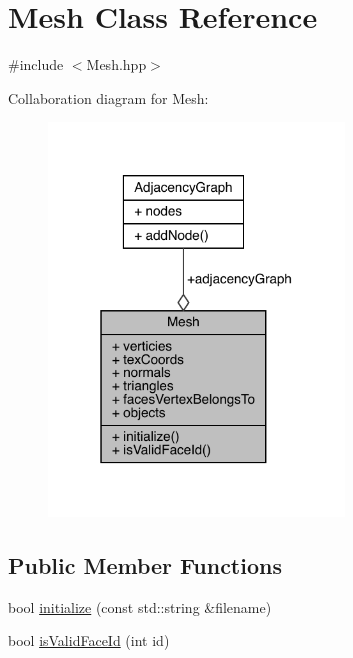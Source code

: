 \hypertarget{class_mesh}{}\section{Mesh Class Reference}
\label{class_mesh}


{\ttfamily \#include $<$Mesh.\+hpp$>$}



Collaboration diagram for Mesh\+:\nopagebreak
\begin{figure}[H]
\begin{center}
\leavevmode
\includegraphics[width=223pt]{class_mesh__coll__graph}
\end{center}
\end{figure}
\subsection*{Public Member Functions}
\begin{DoxyCompactItemize}
\item 
bool \hyperlink{class_mesh_ad93d51d3938b1fe01816746f7d6a121f}{initialize} (const std\+::string \&filename)
\item 
bool \hyperlink{class_mesh_aaa92d27cfbbb7b2ae11d94ded72de982}{is\+Valid\+Face\+Id} (int id)
\end{DoxyCompactItemize}
